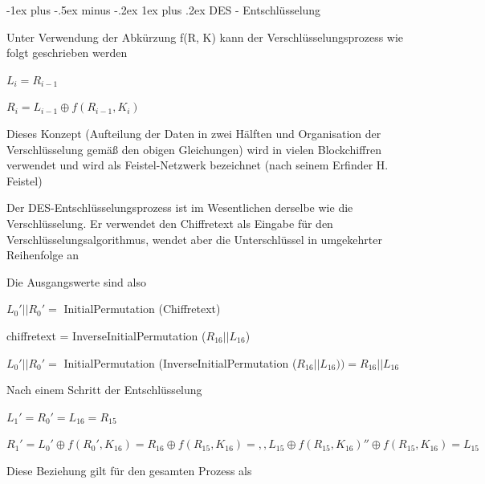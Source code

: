 \documentclass[a4paper]{article}
\makeatletter
\renewcommand{\subsubsection}{\@startsection{subsubsection}{3}{0mm}%
 {-1ex plus -.5ex minus -.2ex}%
 {1ex plus .2ex}%
 {\normalfont\small\bfseries}}
\makeatother
\begin{document}
\begin{multicols}{3}
      \subsubsection{DES - Entschlüsselung}

      \begin{itemize*}
            \item Unter Verwendung der Abkürzung f(R, K) kann der
            Verschlüsselungsprozess wie folgt geschrieben werden
            \begin{itemize*}
                  \item $L_i = R_{i-1}$
                  \item $R_i = L_{i-1}\oplus f(R_{i-1}, K_i)$
                  \item Dieses Konzept (Aufteilung der Daten in zwei Hälften und Organisation der Verschlüsselung gemäß den obigen Gleichungen) wird in vielen Blockchiffren verwendet und wird als Feistel-Netzwerk bezeichnet (nach seinem Erfinder H. Feistel)
            \end{itemize*}
            \item Der DES-Entschlüsselungsprozess ist im Wesentlichen derselbe wie die
            Verschlüsselung. Er verwendet den Chiffretext als Eingabe für den
            Verschlüsselungsalgorithmus, wendet aber die Unterschlüssel in
            umgekehrter Reihenfolge an
            \item Die Ausgangswerte sind also
            \begin{itemize*}
                  \item $L_0' || R_0' =$ InitialPermutation (Chiffretext)
                  \item chiffretext = InverseInitialPermutation ($R_{16} || L_{16}$)
                  \item $L_0' || R_0' =$ InitialPermutation (InverseInitialPermutation ($R_{16}|| L_{16}))=R_{16}|| L_{16}$
            \end{itemize*}
            \item Nach einem Schritt der Entschlüsselung
            \begin{itemize*}
                  \item $L_1' = R_0' = L_{16} = R_{15}$
                  \item $R_1' = L_0' \oplus f(R_0', K_{16})=R_{16}\oplus f(R_{15},K_{16})=,,L_{15}\oplus f(R_{15},K_{16})''\oplus f(R_{15},K_{16}) =L_{15}$
            \end{itemize*}
            \item Diese Beziehung gilt für den gesamten Prozess als

\end{itemize*}
\end{multicols}
\end{document}
